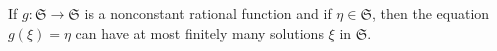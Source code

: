 If $g: \mathfrak{S} \to \mathfrak{S}$ is a nonconstant rational function and if $\eta \in \mathfrak{S}$, then the equation $g(\xi) = \eta$ can have at most finitely many solutions $\xi$ in $\mathfrak{S}$.

